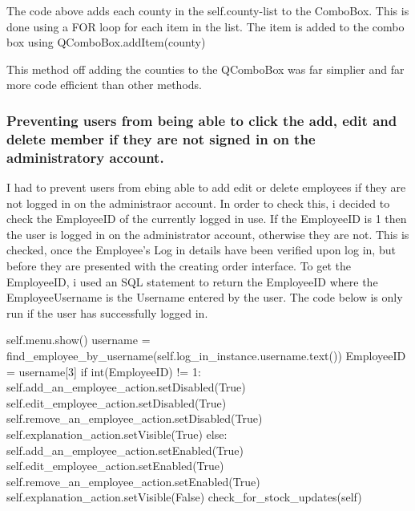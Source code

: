 \begin{python}
The code above adds each county in the self.county-list to the ComboBox. This is done using a FOR loop for each item in the list. The item is added to the combo box using QComboBox.addItem(county)

This method off adding the counties to the QComboBox was far simplier and far more code efficient than other methods.

\pagebreak

\subsubsection{Preventing users from being able to click the add, edit and delete member if they are not signed in on the administratory account.}

I had to prevent users from ebing able to add edit or delete employees if they are not logged in on the administraor account. In order to check this, i decided to check the EmployeeID of the currently logged in use. If the EmployeeID is 1 then the user is logged in on the administrator account, otherwise they are not. This is checked, once the Employee's Log in details have been verified upon log in, but before they are presented with the creating order interface. To get the EmployeeID, i used an SQL statement to return the EmployeeID where the EmployeeUsername is the Username entered by the user. The code below is only run if the user has successfully logged in.

\begin{python}
self.menu.show()
username = find_employee_by_username(self.log_in_instance.username.text())
EmployeeID = username[3]
if int(EmployeeID) != 1:
	self.add_an_employee_action.setDisabled(True)
	self.edit_employee_action.setDisabled(True)
	self.remove_an_employee_action.setDisabled(True)
	self.explanation_action.setVisible(True)
else:
	self.add_an_employee_action.setEnabled(True)
	self.edit_employee_action.setEnabled(True)
	self.remove_an_employee_action.setEnabled(True)
	self.explanation_action.setVisible(False)
	check_for_stock_updates(self)

\end{python}



\end{python}

